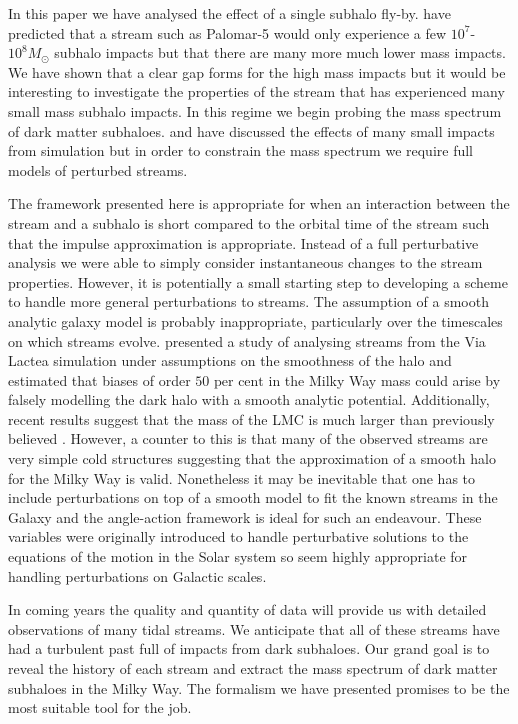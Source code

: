 \documentclass[useAMS,usenatbib,fleqn,a4paper]{mn2e}
\def\percent{\text{ per cent}}
\def\percent{\text{ per cent}}
\begin{document}
In this paper we have analysed the effect of a single subhalo fly-by. \cite{YoonJohnstonHogg} have predicted that a stream such as Palomar-5 would only experience a few $10^7$-$10^8M_\odot$ subhalo impacts but that there are many more much lower mass impacts. We have shown that a clear gap forms for the high mass impacts but it would be interesting to investigate the properties of the stream that has experienced many small mass subhalo impacts. In this regime we begin probing the mass spectrum of dark matter subhaloes. \cite{CarlbergGD12013} and \cite{NganCarlberg2014} have discussed the effects of many small impacts from simulation but in order to constrain the mass spectrum we require full models of perturbed streams.

The framework presented here is appropriate for when an interaction between the stream and a subhalo is short compared to the orbital time of the stream such that the impulse approximation is appropriate. Instead of a full perturbative analysis we were able to simply consider instantaneous changes to the stream properties. However, it is potentially a small starting step to developing a scheme to handle more general perturbations to streams. The assumption of a smooth analytic galaxy model is probably inappropriate, particularly over the timescales on which streams evolve. \cite{Bonaca2014} presented a study of analysing streams from the Via Lactea simulation under assumptions on the smoothness of the halo and estimated that biases of order $50\percent$ in the Milky Way mass could arise by falsely modelling the dark halo with a smooth analytic potential. Additionally, recent results suggest that the mass of the LMC is much larger than previously believed \citep{Kallivayalil2013, Penarrubia2015}. However, a counter to this is that many of the observed streams are very simple cold structures suggesting that the approximation of a smooth halo for the Milky Way is valid. Nonetheless it may be inevitable that one has to include perturbations on top of a smooth model to fit the known streams in the Galaxy and the angle-action framework is ideal for such an endeavour. These variables were originally introduced to handle perturbative solutions to the equations of the motion in the Solar system so seem highly appropriate for handling perturbations on Galactic scales.

In coming years the quality and quantity of data will provide us with detailed observations of many tidal streams. We anticipate that all of these streams have had a turbulent past full of impacts from dark subhaloes. Our grand goal is to reveal the history of each stream and extract the mass spectrum of dark matter subhaloes in the Milky Way. The formalism we have presented promises to be the most suitable tool for the job.
\end{document}
